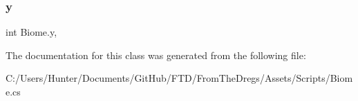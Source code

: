 \mbox{\label{class_biome_a3793ddae113d9c2b545a2dc7c6b96f3a}} 
\subsubsection{\texorpdfstring{y}{y}}
{\footnotesize\ttfamily int Biome.\+y\hspace{0.3cm}{\ttfamily [get]}, {\ttfamily [set]}}



The documentation for this class was generated from the following file\+:\begin{DoxyCompactItemize}
\item 
C\+:/\+Users/\+Hunter/\+Documents/\+Git\+Hub/\+F\+T\+D/\+From\+The\+Dregs/\+Assets/\+Scripts/Biome.\+cs\end{DoxyCompactItemize}
